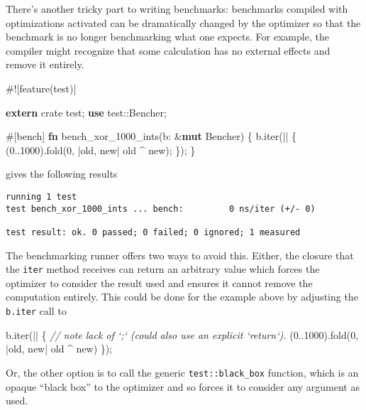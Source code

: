 \documentclass[a4paper,]{book}
\newenvironment{Shaded}{\begin{snugshade}}{\end{snugshade}}
\newcommand{\KeywordTok}[1]{\textcolor[rgb]{0.13,0.29,0.53}{\textbf{{#1}}}}
\newcommand{\DecValTok}[1]{\textcolor[rgb]{0.00,0.00,0.81}{{#1}}}
\newcommand{\CommentTok}[1]{\textcolor[rgb]{0.56,0.35,0.01}{\textit{{#1}}}}
\newcommand{\OtherTok}[1]{\textcolor[rgb]{0.56,0.35,0.01}{{#1}}}
\newcommand{\NormalTok}[1]{{#1}}
\begin{document}
There's another tricky part to writing benchmarks: benchmarks compiled
with optimizations activated can be dramatically changed by the
optimizer so that the benchmark is no longer benchmarking what one
expects. For example, the compiler might recognize that some calculation
has no external effects and remove it entirely.

\begin{Shaded}
\begin{Highlighting}[]
\NormalTok{#![feature(test)]}

\KeywordTok{extern} \NormalTok{crate test;}
\KeywordTok{use} \NormalTok{test::Bencher;}

\OtherTok{#[}\NormalTok{bench}\OtherTok{]}
\KeywordTok{fn} \NormalTok{bench_xor_1000_ints(b: &}\KeywordTok{mut} \NormalTok{Bencher) \{}
    \NormalTok{b.iter(|| \{}
        \NormalTok{(}\DecValTok{0.}\NormalTok{.}\DecValTok{1000}\NormalTok{).fold(}\DecValTok{0}\NormalTok{, |old, new| old ^ new);}
    \NormalTok{\});}
\NormalTok{\}}
\end{Highlighting}
\end{Shaded}

gives the following results

\begin{verbatim}
running 1 test
test bench_xor_1000_ints ... bench:         0 ns/iter (+/- 0)

test result: ok. 0 passed; 0 failed; 0 ignored; 1 measured
\end{verbatim}

The benchmarking runner offers two ways to avoid this. Either, the
closure that the \texttt{iter} method receives can return an arbitrary
value which forces the optimizer to consider the result used and ensures
it cannot remove the computation entirely. This could be done for the
example above by adjusting the \texttt{b.iter} call to

\begin{Shaded}
\begin{Highlighting}[]
\NormalTok{b.iter(|| \{}
    \CommentTok{// note lack of `;` (could also use an explicit `return`).}
    \NormalTok{(}\DecValTok{0.}\NormalTok{.}\DecValTok{1000}\NormalTok{).fold(}\DecValTok{0}\NormalTok{, |old, new| old ^ new)}
\NormalTok{\});}
\end{Highlighting}
\end{Shaded}

Or, the other option is to call the generic \texttt{test::black\_box}
function, which is an opaque ``black box'' to the optimizer and so
forces it to consider any argument as used.
\end{document}
